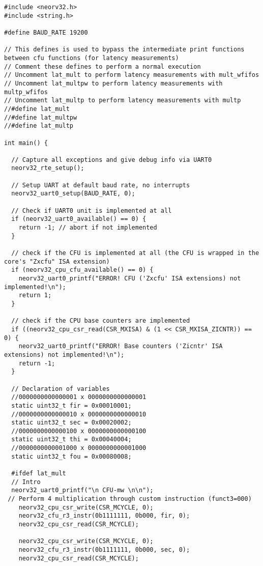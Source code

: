 \begin{code}
\begin{verbatim}
#include <neorv32.h>
#include <string.h>

#define BAUD_RATE 19200

// This defines is used to bypass the intermediate print functions between cfu functions (for latency measurements)
// Comment these defines to perform a normal execution
// Uncomment lat_mult to perform latency measurements with mult_wfifos
// Uncomment lat_multpw to perform latency measurements with multp_wfifos
// Uncomment lat_multp to perform latency measurements with multp
//#define lat_mult
//#define lat_multpw
//#define lat_multp

int main() {
    
  // Capture all exceptions and give debug info via UART0
  neorv32_rte_setup();

  // Setup UART at default baud rate, no interrupts
  neorv32_uart0_setup(BAUD_RATE, 0);

  // Check if UART0 unit is implemented at all
  if (neorv32_uart0_available() == 0) {
    return -1; // abort if not implemented
  }

  // check if the CFU is implemented at all (the CFU is wrapped in the core's "Zxcfu" ISA extension)
  if (neorv32_cpu_cfu_available() == 0) {
    neorv32_uart0_printf("ERROR! CFU ('Zxcfu' ISA extensions) not implemented!\n");
    return 1;
  }

  // check if the CPU base counters are implemented
  if ((neorv32_cpu_csr_read(CSR_MXISA) & (1 << CSR_MXISA_ZICNTR)) == 0) {
    neorv32_uart0_printf("ERROR! Base counters ('Zicntr' ISA extensions) not implemented!\n");
    return -1;
  }

  // Declaration of variables 
  //0000000000000001 x 0000000000000001
  static uint32_t fir = 0x00010001;
  //0000000000000010 x 0000000000000010
  static uint32_t sec = 0x00020002;
  //0000000000000100 x 0000000000000100
  static uint32_t thi = 0x00040004;
  //0000000000001000 x 0000000000001000
  static uint32_t fou = 0x00080008;

  #ifdef lat_mult
  // Intro
  neorv32_uart0_printf("\n CFU-mw \n\n");
 // Perform 4 multiplication through custom instruction (funct3=000)
    neorv32_cpu_csr_write(CSR_MCYCLE, 0);
    neorv32_cfu_r3_instr(0b1111111, 0b000, fir, 0); 
    neorv32_cpu_csr_read(CSR_MCYCLE); 

    neorv32_cpu_csr_write(CSR_MCYCLE, 0);
    neorv32_cfu_r3_instr(0b1111111, 0b000, sec, 0); 
    neorv32_cpu_csr_read(CSR_MCYCLE); 


\end{verbatim}
\end{code}
